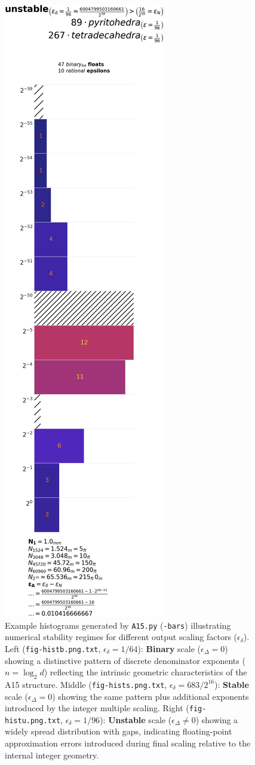 \documentclass[10pt]{article}
\begin{document}
\begin{figure}[!htb]
    \includegraphics[width=.335\textwidth]{fig-histu}%
    \caption{Example histograms generated by \texttt{A15.py} (\texttt{-bars}) illustrating numerical stability regimes for different output scaling factors ($\epsilon_\delta$). Left (\texttt{fig-histb.png.txt}, $\epsilon_\delta=1/64$): \textbf{Binary} scale ($\epsilon_\Delta=0$) showing a distinctive pattern of discrete denominator exponents ($n = \log_2 d$) reflecting the intrinsic geometric characteristics of the A15 structure. Middle (\texttt{fig-hists.png.txt}, $\epsilon_\delta=683/2^{16}$): \textbf{Stable} scale ($\epsilon_\Delta=0$) showing the same pattern plus additional exponents introduced by the integer multiple scaling. Right (\texttt{fig-histu.png.txt}, $\epsilon_\delta=1/96$): \textbf{Unstable} scale ($\epsilon_\Delta \neq 0$) showing a widely spread distribution with gaps, indicating floating-point approximation errors introduced during final scaling relative to the internal integer geometry.}
    \label{fig-hist}
\end{figure}
\end{document}
